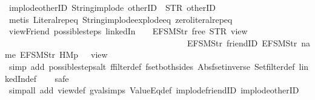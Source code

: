 \begin{isabellebody}
\endisatagproof
{\isafoldproof}%
%
\isadelimproof
\isanewline
%
\endisadelimproof
\isanewline
{}\isamarkupfalse%
\ implode{\isacharunderscore}otherID{\isacharcolon}\ {\isachardoublequoteopen}String{\isachardot}implode\ {\isacharprime}{\isacharprime}otherID{\isacharprime}{\isacharprime}\ {\isacharequal}\ STR\ {\isacharprime}{\isacharprime}otherID{\isacharprime}{\isacharprime}{\isachardoublequoteclose}\isanewline
%
\isadelimproof
\ \ %
\endisadelimproof
%
\isatagproof
{}\isamarkupfalse%
\ {\isacharparenleft}metis\ Literal{\isachardot}rep{\isacharunderscore}eq\ String{\isachardot}implode{\isacharunderscore}explode{\isacharunderscore}eq\ zero{\isacharunderscore}literal{\isachardot}rep{\isacharunderscore}eq{\isacharparenright}%
\endisatagproof
{\isafoldproof}%
%
\isadelimproof
\isanewline
%
\endisadelimproof
\isanewline
{}\isamarkupfalse%
\ viewFriend{\isacharcolon}\ {\isachardoublequoteopen}possible{\isacharunderscore}steps\ linkedIn\ {}\ {\isacharless}{}\ {\isacharcolon}{\isacharequal}\ EFSM{\isachardot}Str\ {\isacharprime}{\isacharprime}free{\isacharprime}{\isacharprime}{\isachargreater}\ STR\ {\isacharprime}{\isacharprime}view{\isacharprime}{\isacharprime}\isanewline
\ \ \ \ \ \ \ \ \ \ \ \ \ \ \ \ \ \ \ \ \ \ \ \ \ \ \ \ \ \ \ \ \ \ \ \ \ \ \ \ \ \ \ {\isacharbrackleft}EFSM{\isachardot}Str\ {\isacharprime}{\isacharprime}friendID{\isacharprime}{\isacharprime}{\isacharcomma}\ EFSM{\isachardot}Str\ {\isacharprime}{\isacharprime}name{\isacharprime}{\isacharprime}{\isacharcomma}\ EFSM{\isachardot}Str\ {\isacharprime}{\isacharprime}HM{}p{\isacharprime}{\isacharprime}{\isacharbrackright}\ {\isacharequal}\ {\isacharbraceleft}{\isacharbar}{\isacharparenleft}{}{\isacharcomma}\ view{\isacharparenright}{\isacharbar}{\isacharbraceright}{\isachardoublequoteclose}\isanewline
%
\isadelimproof
\ \ %
\endisadelimproof
%
\isatagproof
{}\isamarkupfalse%
\ {\isacharparenleft}simp\ add{\isacharcolon}\ possible{\isacharunderscore}steps{\isacharunderscore}alt\ ffilter{\isacharunderscore}def\ fset{\isacharunderscore}both{\isacharunderscore}sides\ Abs{\isacharunderscore}fset{\isacharunderscore}inverse\ Set{\isachardot}filter{\isacharunderscore}def\ linkedIn{\isacharunderscore}def{\isacharparenright}\isanewline
\ \ \isamarkupfalse%
\ safe\isanewline
\ \ \isamarkupfalse%
\ {\isacharparenleft}simp{\isacharunderscore}all\ add{\isacharcolon}\ view{}{\isacharunderscore}def\ gval{\isachardot}simps\ ValueEq{\isacharunderscore}def\ implode{\isacharunderscore}friendID\ implode{\isacharunderscore}otherID\isanewline

\end{isabellebody}
